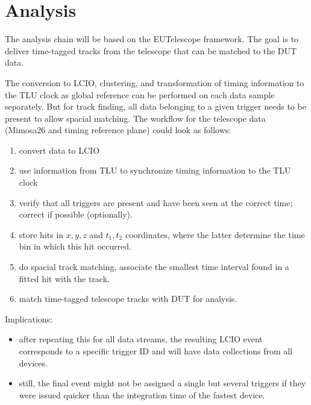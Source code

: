 \documentclass[paper=a4, fontsize=11pt]{scrartcl}	%
\numberwithin{equation}{section}		%
\numberwithin{figure}{section}			%
\numberwithin{table}{section}				%
\begin{document}
\section{Analysis}
\label{sec:analysis}
The analysis chain will be based on the EUTelescope framework. The
goal is to deliver time-tagged tracks from the telescope that can be
matched to the DUT data.

The conversion to LCIO, clustering, and transformation of timing
information to the TLU clock as global reference can be performed on
each data sample separately. But for track finding, all data belonging
to a given trigger needs to be present to allow spacial matching. The
workflow for the telescope data (Mimosa26 and timing reference plane)
could look as follows:

\begin{enumerate}
\item convert data to LCIO
\item use information from TLU to synchronize timing information to the
  TLU clock
\item verify that all triggers are present and have been seen at the
  correct time; correct if possible (optionally).
\item store hits in $x,y,z$ and $t_1, t_2$ coordinates, where the
  latter determine the time bin in which this hit occurred.
\item do spacial track matching, associate the smallest time interval
  found in a fitted hit with the track.
\item match time-tagged telescope tracks with DUT for analysis.
\end{enumerate}

Implications:
\begin{itemize}
\item after repeating this for all data streams, the resulting LCIO
  event corresponds to a specific trigger ID and will have data
  collections from all devices.
\item still, the final event might not be assigned a single but
  several triggers if they were issued quicker than the
  integration time of the fastest device.
\end{itemize}
\end{document}
